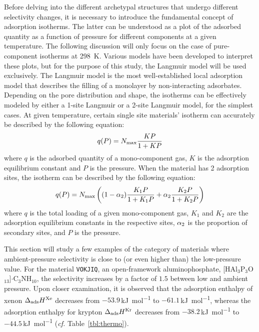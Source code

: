 \documentclass[main.tex]{subfiles}
\begin{document}
Before delving into the different archetypal structures that undergo different selectivity changes, it is necessary to introduce the fundamental concept of adsorption isotherms. The latter can be understood as a plot of the adsorbed quantity as a function of pressure for different components at a given temperature. The following discussion will only focus on the case of pure-component isotherms at \SI{298}{\kelvin}. Various models have been developed to interpret these plots,\autocite{Al_Ghouti_2020} but for the purpose of this study, the Langmuir model will be used exclusively. The Langmuir model is the most well-established local adsorption model that describes the filling of a monolayer by non-interacting adsorbates. Depending on the pore distribution and shape, the isotherms can be effectively modeled by either a 1-site Langmuir or a 2-site Langmuir model, for the simplest cases. At given temperature, certain single site materials' isotherm can accurately be described by the following equation:
\begin{equation}\label{eq:langmuir_1}
    q(P) = N_{\text{max}}\dfrac{KP}{1+KP}
\end{equation}
where $q$ is the adsorbed quantity of a mono-component gas, $K$ is the adsorption equilibrium constant and $P$ is the pressure. When the material has 2 adsorption sites, the isotherm can be described by the following equation:
\begin{equation}\label{eq:langmuir_2}
    q(P) = N_{\text{max}}\left((1-\alpha_{\text{2}})\dfrac{K_{\text{1}}P}{1+K_{\text{1}}P}+\alpha_{\text{2}}\dfrac{K_{\text{2}}P}{1+K_{\text{2}}P}\right)
\end{equation}
where $q$ is the total loading of a given mono-component gas, $K_1$ and $K_2$ are the adsorption equilibrium constants in the respective sites, $\alpha_{\text{2}}$ is the proportion of secondary sites, and $P$ is the pressure.
  
This section will study a few examples of the category of materials where ambient-pressure selectivity is close to (or even higher than) the low-pressure value. For the material \texttt{VOKJIQ},\autocite{VOKJIQ} an open-framework aluminophosphate, [HAl$_3$P$_3$O$_{13}$]$\cdot$C$_3$NH$_{10}$, the selectivity increases by a factor of $1.5$ between low and ambient pressure. Upon closer examination, it is observed that the adsorption enthalpy of xenon $\Delta_{\text{ads}}H^{\text{Xe}}$ decreases from $-53.9$\,\si{\kilo\joule\per\mol} to $-61.1$\,\si{\kilo\joule\per\mol}, whereas the adsorption enthalpy for krypton $\Delta_{\text{ads}}H^{\text{Kr}}$ decreases from $-38.2$\,\si{\kilo\joule\per\mol} to $-44.5$\,\si{\kilo\joule\per\mol} (\emph{cf.} Table~\ref{tbl:thermo}). 
\end{document}
